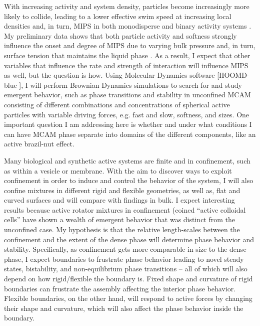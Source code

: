\documentclass[11pt]{article}
\begin{document}
With increasing activity and system density, particles become increasingly more likely to collide, leading to a lower effective swim speed at increasing local densities and, in turn, MIPS in both monodisperse \cite{Theurkauff} and binary activity systems \cite{Kolb}.  My preliminary data shows that both particle activity and softness strongly influence the onset and degree of MIPS due to varying bulk pressure and, in turn, surface tension that maintains the liquid phase \cite{Kolb3, Lauersdorf}. As a result, I expect that other variables that influence the rate and strength of interaction will influence MIPS as well, but the question is how. Using Molecular Dynamics software [HOOMD-blue \cite{Anderson5}], I will perform Brownian Dynamics simulations to search for and study emergent behavior, such as phase transitions and stability in unconfined MCAM consisting of different combinations and concentrations of spherical active particles with variable driving forces, e.g. fast and slow, softness, and sizes. One important question I am addressing here is whether and under what conditions I can have MCAM phase separate into domains of the different components, like an active brazil-nut effect.

Many biological and synthetic active systems are finite and in confinement, such as within a vesicle or membrane. With the aim to discover ways to exploit confinement in order to induce and control the behavior of the system, I will also confine mixtures in different rigid and flexible geometries, as well as, flat and curved surfaces and will compare with findings in bulk. I expect interesting results because active rotator mixtures in confinement (coined “active colloidal cells” \cite{Van Anders, Nguyen} have shown a wealth of emergent behavior that was distinct from the unconfined case. My hypothesis is that the relative length-scales between the confinement and the extent of the dense phase will determine phase behavior and stability. Specifically, as confinement gets more comparable in size to the dense phase, I expect boundaries to frustrate phase behavior leading to novel steady states, bistability, and non-equilibrium phase transitions -- all of which will also depend on how rigid/flexible the boundary is.  Fixed shape and curvature of rigid boundaries can frustrate the assembly affecting the interior phase behavior. Flexible boundaries, on the other hand, will respond to active forces by changing their shape and curvature, which will also affect the phase behavior inside the boundary.
\end{document}
